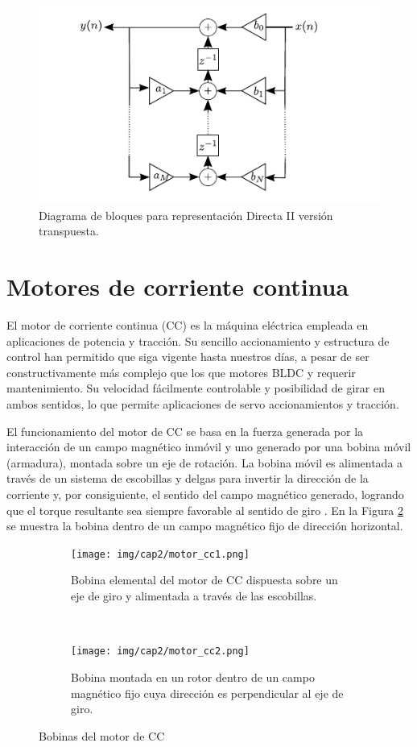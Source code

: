 \begin{figure}[H]
  \centering
  \includegraphics[scale=1.2]{img/cap2/tdf2}
  \caption{Diagrama de bloques para representación Directa II versión transpuesta.}
  \label{cap2_td2}
\end{figure}

\section{Motores de corriente continua}

El motor de corriente continua (CC) es la máquina eléctrica empleada en aplicaciones de potencia y tracción. Su sencillo accionamiento y estructura de control han permitido que siga vigente hasta nuestros días, a pesar de ser constructivamente más complejo que los que motores BLDC y requerir mantenimiento. Su velocidad fácilmente controlable y posibilidad de girar en ambos sentidos, lo  que permite aplicaciones de servo accionamientos y tracción.

El funcionamiento del motor de CC se basa en la fuerza generada por la interacción de un campo magnético inmóvil y uno generado por una bobina móvil (armadura), montada sobre un eje de rotación. La bobina móvil es alimentada a través de un sistema de escobillas y delgas para invertir la dirección de la corriente y, por consiguiente, el sentido del campo magnético generado, logrando que el torque resultante sea siempre favorable al sentido de giro \cite{vargas2006}. En la Figura \ref{cap2_motorcc} se muestra la bobina dentro de un campo magnético fijo de dirección horizontal.

\begin{figure}[H]
    \centering
    \begin{subfigure}[b]{0.48\textwidth}
            \texttt{[image: img/cap2/motor\_cc1.png]}
            \caption{Bobina elemental del motor de CC dispuesta sobre un eje de giro y alimentada a través de las escobillas.}
    \end{subfigure}
    ~
    \begin{subfigure}[b]{0.48\textwidth}
            \texttt{[image: img/cap2/motor\_cc2.png]}
            \caption{Bobina montada en un rotor dentro de un campo magnético fijo cuya dirección es perpendicular al eje de giro.}
    \end{subfigure}
    \caption{Bobinas del motor de CC}
    \label{cap2_motorcc}
\end{figure}


